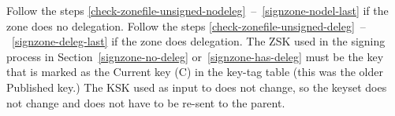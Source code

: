 Follow the steps
\ref{check-zonefile-unsigned-nodeleg}~--~\ref{signzone-nodel-last}
if the zone does no delegation.  Follow the steps
\ref{check-zonefile-unsigned-deleg}~--~\ref{signzone-deleg-last}
if the zone does delegation.  The ZSK used in the signing process in
Section~\ref{signzone-no-deleg} or~\ref{signzone-has-deleg} must be the key
that is marked as the Current key (C) in the key-tag table (this was the older
Published key.) The KSK used as input to  does not
change, so the keyset does not change and does not have to be re-sent to the
parent.
